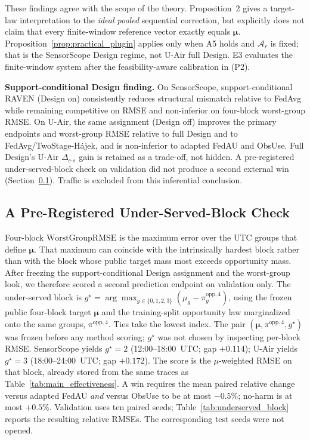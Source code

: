 \documentclass[letterpaper,journal]{IEEEtran}
\begin{document}
These findings agree with the scope of the theory.  Proposition~2 gives
a target-law interpretation to the \emph{ideal pooled} sequential correction,
but explicitly does not claim that every finite-window reference vector exactly
equals $\boldsymbol{\mu}$.  Proposition~\ref{prop:practical_plugin}
applies only when A5 holds and $\mathcal{A}_r$ is fixed; that is the
SensorScope Design regime, not U-Air full Design.  E3 evaluates the
finite-window system after the feasibility-aware calibration in (P2).

\noindent\textbf{Support-conditional Design finding.}
On SensorScope, support-conditional RAVEN (Design on) consistently reduces structural
mismatch relative to FedAvg while remaining competitive on RMSE and
non-inferior on four-block worst-group RMSE.  On U-Air, the same assignment
(Design off) improves the primary endpoints and worst-group
RMSE relative to full Design and to FedAvg/TwoStage-H\'ajek, and is
non-inferior to adapted FedAU and ObsUse.  Full Design's U-Air
$\Delta_{c\text{-}s}$ gain is retained as a trade-off, not hidden.
A pre-registered under-served-block check on validation did not produce
a second external win (Section~\ref{subsec:eval_underserved}).
Traffic is excluded from this inferential conclusion.

\subsection{A Pre-Registered Under-Served-Block Check}
\label{subsec:eval_underserved}

Four-block $\mathrm{WorstGroupRMSE}$ is the maximum error over the UTC
groups that define $\boldsymbol\mu$.  That maximum can coincide with the
intrinsically hardest block rather than with the block whose public
target mass most exceeds opportunity mass.  After freezing the
support-conditional Design assignment and the worst-group look, we therefore scored a second
prediction endpoint on validation only.  The under-served block is
$g^{\star}=\arg\max_{g\in\{0,1,2,3\}}
(\mu_g-\pi^{\mathrm{opp},4}_g)$,
using the frozen public four-block target $\boldsymbol\mu$ and the
training-split opportunity law marginalized onto the same groups,
$\pi^{\mathrm{opp},4}$.  Ties take the lowest index.  The pair
$(\boldsymbol\mu,\pi^{\mathrm{opp},4},g^{\star})$ was frozen before any
method scoring; $g^{\star}$ was not chosen by inspecting per-block RMSE.
SensorScope yields $g^{\star}=2$ (12:00--18:00~UTC; gap $+0.114$);
U-Air yields $g^{\star}=3$ (18:00--24:00~UTC; gap $+0.172$).  The score
is the $\mu$-weighted RMSE on that block, already stored from the same
traces as Table~\ref{tab:main_effectiveness}.  A win requires the mean
paired relative change versus adapted FedAU \emph{and} versus ObsUse to
be at most $-0.5\%$; no-harm is at most $+0.5\%$.  Validation uses ten
paired seeds; Table~\ref{tab:underserved_block} reports the resulting
relative RMSEs.  The corresponding test seeds were not opened.
\end{document}

